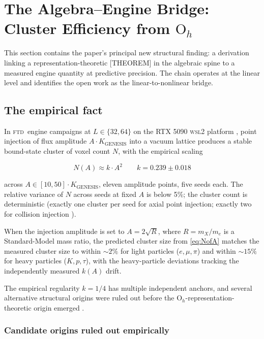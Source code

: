 \documentclass[11pt,reqno]{amsart}
\theoremstyle{plain}
\theoremstyle{definition}
\theoremstyle{remark}
\numberwithin{equation}{section}
\newcommand{\Ohgrp}{\mathrm{O}_h}
\newcommand{\KGen}{K_{\!\mathrm{GENESIS}}}
\newcommand{\FTD}{\textsc{ftd}}
\begin{document}
\section{The Algebra--Engine Bridge: Cluster Efficiency from $\Ohgrp$}
\label{sec:bridge}

This section contains the paper's principal new structural finding:
a derivation linking a representation-theoretic [THEOREM] in the
algebraic spine to a measured engine quantity at predictive
precision. The chain operates at the linear level and identifies
the open work as the linear-to-nonlinear bridge.

\subsection{The empirical fact}

In \FTD\ engine campaigns at $L \in \{32, 64\}$ on the RTX 5090
\textsc{wsl2} platform \cite{ledger,emergentG1}, point injection
of flux amplitude $A\cdot\KGen$ into a vacuum lattice produces a
stable bound-state cluster of voxel count $N$, with the empirical
scaling

\begin{equation}
\label{eq:NofA}
  N(A) \approx k \cdot A^{2}
  \qquad k = 0.239 \pm 0.018
\end{equation}

across $A \in [10, 50]\cdot\KGen$, eleven amplitude points, five
seeds each. The relative variance of $N$ across seeds at fixed $A$
is below 5\%; the cluster count is deterministic
(exactly one cluster per seed for axial point injection;
exactly two for collision injection \cite{emergentG1}).

When the injection amplitude is set to $A = 2\sqrt{R}$, where
$R = m_{X}/m_{e}$ is a Standard-Model mass ratio, the predicted
cluster size from \eqref{eq:NofA} matches the measured cluster size
to within $\sim\!2\%$ for light particles ($e, \mu, \pi$)
and within $\sim\!15\%$ for heavy particles ($K, p, \tau$),
with the heavy-particle deviations tracking the independently
measured $k(A)$ drift.

The empirical regularity $k = 1/4$ has multiple independent anchors,
and several alternative structural origins were ruled out before the
$\Ohgrp$-representation-theoretic origin emerged \cite{ledger}.

\subsubsection*{Candidate origins ruled out empirically}
\end{document}

